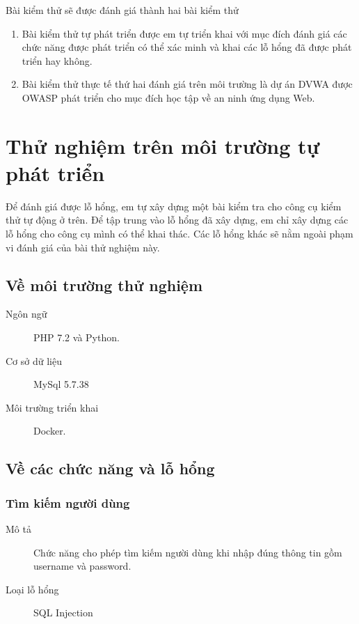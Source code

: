 \documentclass[./../main.tex]{subfiles}
\begin{document}
Bài kiểm thử sẽ được đánh giá thành hai bài kiểm thử
\begin{enumerate}
	\item Bài kiểm thử tự phát triển được em tự triển khai với mục đích đánh
	      giá các chức năng được phát triển có thể xác minh và khai các lỗ hổng
	      đã được phát triển hay không.
	\item Bài kiểm thử thực tế thứ hai đánh giá trên môi trường là dự án
	      DVWA được OWASP phát triển cho mục đích học tập về an ninh ứng dụng Web.
\end{enumerate}

\section{Thử nghiệm trên môi trường tự phát triển}

Để đánh giá được lỗ hổng, em tự xây dựng một bài kiểm tra cho công cụ kiểm
thử tự động ở trên. Để tập trung vào lỗ hổng đã xây dựng, em chỉ xây dựng
các lỗ hổng cho công cụ mình có thể khai thác. Các lỗ hổng khác sẽ nằm
ngoài phạm vi đánh giá của bài thử nghiệm này.

\subsection{Về môi trường thử nghiệm}

\begin{description}
	\item[Ngôn ngữ] PHP 7.2 và Python.

	\item [Cơ sở dữ liệu] MySql 5.7.38

	\item [Môi trường triển khai] Docker.
\end{description}

\subsection{Về các chức năng và lỗ hổng}

\subsubsection{Tìm kiếm người dùng}

\begin{description}
	\item[Mô tả] Chức năng cho phép tìm kiếm người dùng khi nhập đúng
	      thông tin gồm username và password.
	\item [Loại lỗ hổng] SQL Injection
\end{description}
\end{document}
